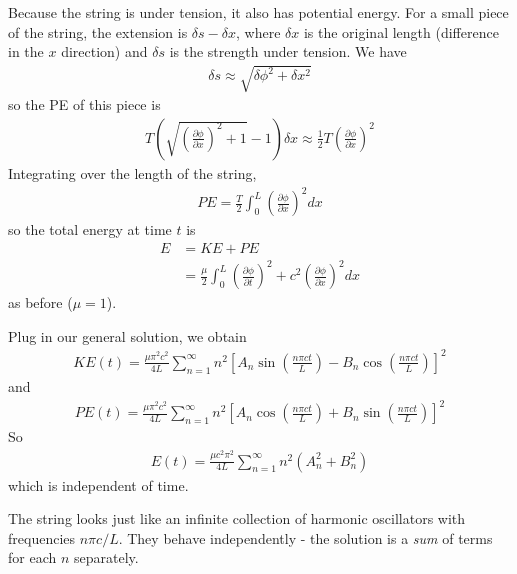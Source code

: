 \documentclass[a4paper]{article}
\begin{document}
\begin{eg}
Because the string is under tension, it also has potential energy. For a small piece of the string, the extension is $\delta s - \delta x$, where $\delta x$ is the original length (difference in the $x$ direction) and $\delta s$ is the strength under tension. We have
\begin{equation*}
\begin{aligned}
\delta s \approx \sqrt{\delta \phi^2 + \delta x^2}
\end{aligned}
\end{equation*}
so the PE of this piece is
\begin{equation*}
\begin{aligned}
T\left(\sqrt{\left(\frac{\partial \phi}{\partial x}\right)^2 +1} - 1 \right) \delta x \approx \frac{1}{2}T \left(\frac{\partial \phi}{\partial x}\right)^2
\end{aligned}
\end{equation*}
Integrating over the length of the string,
\begin{equation*}
\begin{aligned}
PE = \frac{T}{2}\int_0^L \left(\frac{\partial \phi}{\partial x}\right)^2 dx
\end{aligned}
\end{equation*}
so the total energy at time $t$ is
\begin{equation*}
\begin{aligned}
E &= KE + PE\\
&= \frac{\mu}{2} \int_0^L \left(\frac{\partial \phi}{\partial t}\right)^2 + c^2 \left(\frac{\partial \phi}{\partial x}\right)^2 dx
\end{aligned}
\end{equation*}
as before ($\mu = 1$).

Plug in our general solution, we obtain
\begin{equation*}
\begin{aligned}
KE\left(t\right) = \frac{\mu \pi^2 c^2}{4L}\sum_{n=1}^\infty n^2 \left[A_n \sin\left(\frac{n\pi ct}{L}\right) - B_n \cos\left(\frac{n\pi ct}{L}\right)\right]^2
\end{aligned}
\end{equation*}
and
\begin{equation*}
\begin{aligned}
PE\left(t\right) = \frac{\mu \pi^2 c^2}{4L}\sum_{n=1}^\infty n^2 \left[A_n \cos\left(\frac{n\pi ct}{L}\right) + B_n \sin\left(\frac{n\pi ct}{L}\right)\right]^2
\end{aligned}
\end{equation*}
So
\begin{equation*}
\begin{aligned}
E\left(t\right) = \frac{\mu c^2 \pi^2}{4L} \sum_{n=1}^\infty n^2\left(A_n^2 + B_n^2\right)
\end{aligned}
\end{equation*}
which is independent of time.

The string looks just like an infinite collection of harmonic oscillators with frequencies $n\pi c/L$. They behave independently - the solution is a \emph{sum} of terms for each $n$ separately.
\end{eg}
\end{document}
